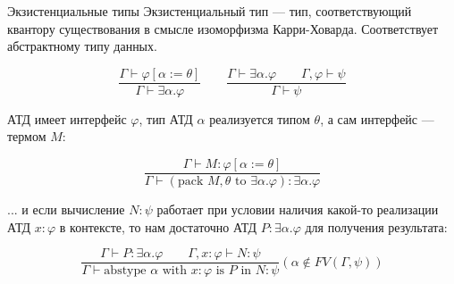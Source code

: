 \documentclass[aspectratio=169]{beamer}
\begin{document}
\begin{frame}{Экзистенциальные типы}
	Экзистенциальный тип --- тип, соответствующий квантору существования в смысле изоморфизма Карри-Ховарда.
	Соответствует абстрактному типу данных.

	 $$\dfrac{\Gamma\vdash\varphi[\alpha:=\theta]}{\Gamma\vdash\exists\alpha.\varphi}\quad\quad
	  \dfrac{\Gamma\vdash\exists\alpha.\varphi\qquad\Gamma,\varphi\vdash\psi}{\Gamma\vdash\psi}$$

	АТД имеет интерфейс $\varphi$, тип АТД $\alpha$ реализуется типом $\theta$, а сам интерфейс --- термом $M$:

	$$\dfrac{\Gamma \vdash M : \varphi[\alpha := \theta]}{\Gamma\vdash (\text{pack } M, \theta \text{ to } \exists \alpha . \varphi) : \exists \alpha.\varphi}$$

	... и если вычисление $N:\psi$ работает при условии наличия какой-то реализации АТД $x:\varphi$ в контексте, то нам достаточно
	АТД $P:\exists\alpha.\varphi$ для получения результата:

	$$\dfrac{\Gamma \vdash P : \exists \alpha . \varphi\qquad\Gamma, x : \varphi \vdash N : \psi}{\Gamma \vdash \text{abstype } \alpha \text{ with } x:\varphi \text{ is } P \text{ in } N:\psi}
	(\alpha \notin FV(\Gamma, \psi))$$


	 
\end{frame}
	 
\end{document}
